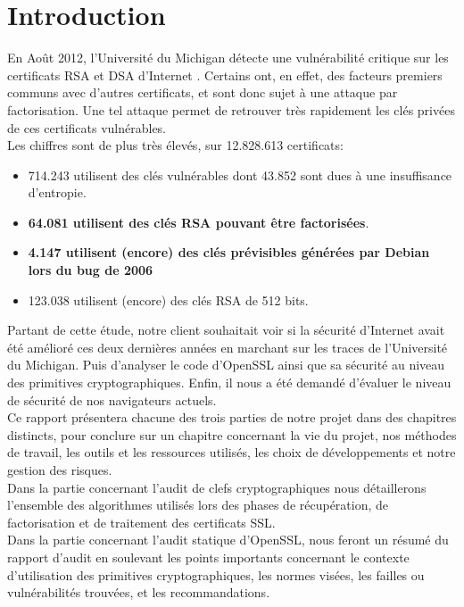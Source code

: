 \section*{Introduction}

En Août 2012, l'Université du Michigan détecte une vulnérabilité critique sur les certificats RSA et DSA d'Internet \cite{mining2012nadia}. Certains ont, en effet, des facteurs premiers communs avec d'autres certificats, et sont donc sujet à une attaque par factorisation. Une tel attaque permet de retrouver très rapidement les clés privées de ces certificats vulnérables.\\
Les chiffres sont de plus très élevés, sur 12.828.613 certificats:
\begin{itemize}
\item 714.243 utilisent des clés vulnérables dont 43.852 sont dues à une insuffisance d'entropie.
\item \textbf{64.081 utilisent des clés RSA pouvant être factorisées}.
\item \textbf{4.147 utilisent (encore) des clés prévisibles générées par Debian lors du bug de 2006}
\item 123.038 utilisent (encore) des clés RSA de 512 bits.\\
\end{itemize}

Partant de cette étude, notre client souhaitait voir si la sécurité d'Internet avait été amélioré ces deux dernières années en marchant sur les traces de l'Université du Michigan. Puis d'analyser le code d'OpenSSL ainsi que sa sécurité au niveau des primitives cryptographiques. Enfin, il nous a été demandé d'évaluer le niveau de sécurité de nos navigateurs actuels.\\

Ce rapport présentera chacune des trois parties de notre projet dans des chapitres distincts, pour conclure sur un chapitre concernant la vie du projet, nos méthodes de travail, les outils et les ressources utilisés, les choix de développements et notre gestion des risques.\\

Dans la partie concernant l'audit de clefs cryptographiques nous détaillerons l'ensemble des algorithmes utilisés lors des phases de récupération, de factorisation et de traitement des certificats SSL.\\

Dans la partie concernant l'audit statique d'OpenSSL, nous feront un résumé du rapport d'audit en soulevant les points importants concernant le contexte d'utilisation des primitives cryptographiques, les normes visées, les failles ou vulnérabilités trouvées, et les recommandations.\\

